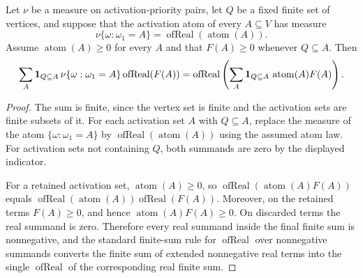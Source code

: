\begin{helper}
Let $\nu$ be a measure on activation-priority pairs, let $Q$ be a fixed
finite set of vertices, and suppose that the activation atom of every
$A\subseteq V$ has measure
\[
\nu\{\omega:\omega_1=A\}=\operatorname{ofReal}(\operatorname{atom}(A)).
\]
Assume $\operatorname{atom}(A)\ge 0$ for every $A$ and that $F(A)\ge 0$ whenever
$Q\subseteq A$.  Then
\[
\sum_A {\bf 1}_{Q\subseteq A}\,
\nu\{\omega:\omega_1=A\}\operatorname{ofReal}(F(A))
=
\operatorname{ofReal}\left(
\sum_A {\bf 1}_{Q\subseteq A}\,\operatorname{atom}(A)F(A)\right).
\]
\end{helper}
\begin{proof}
The sum is finite, since the vertex set is finite and the activation sets are
finite subsets of it.  For each activation set $A$ with $Q\subseteq A$, replace
the measure of the atom $\{\omega:\omega_1=A\}$ by
$\operatorname{ofReal}(\operatorname{atom}(A))$ using the assumed atom law.
For activation sets not containing $Q$, both summands are zero by the displayed
indicator.

For a retained activation set, $\operatorname{atom}(A)\ge 0$, so
$\operatorname{ofReal}(\operatorname{atom}(A)F(A))$ equals
$\operatorname{ofReal}(\operatorname{atom}(A))\operatorname{ofReal}(F(A))$.
Moreover, on the retained terms $F(A)\ge 0$, and hence
$\operatorname{atom}(A)F(A)\ge 0$.  On discarded terms the real summand is
zero.  Therefore every real summand inside the final finite sum is
nonnegative, and the standard finite-sum rule for $\operatorname{ofReal}$ over
nonnegative summands converts the finite sum of extended nonnegative real
terms into the single $\operatorname{ofReal}$ of the corresponding real finite
sum.
\end{proof}
